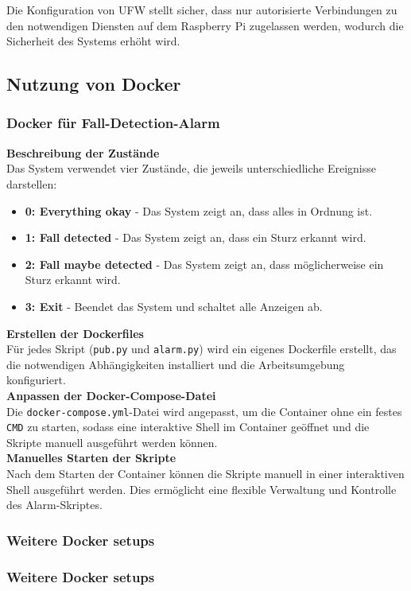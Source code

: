 Die Konfiguration von UFW stellt sicher, dass nur autorisierte Verbindungen zu den notwendigen Diensten auf dem Raspberry Pi zugelassen werden, wodurch die Sicherheit des Systems erhöht wird.


\subsection{Nutzung von Docker}

\subsubsection{Docker für Fall-Detection-Alarm}

\textbf{Beschreibung der Zustände}\\

Das System verwendet vier Zustände, die jeweils unterschiedliche Ereignisse darstellen:

\begin{itemize}
	\item \textbf{0: Everything okay} - Das System zeigt an, dass alles in Ordnung ist.
	\item \textbf{1: Fall detected} - Das System zeigt an, dass ein Sturz erkannt wird.
	\item \textbf{2: Fall maybe detected} - Das System zeigt an, dass möglicherweise ein Sturz erkannt wird.
	\item \textbf{3: Exit} - Beendet das System und schaltet alle Anzeigen ab.
\end{itemize}

\textbf{Erstellen der Dockerfiles}\\

Für jedes Skript (\texttt{pub.py} und \texttt{alarm.py}) wird ein eigenes Dockerfile erstellt, das die notwendigen Abhängigkeiten installiert und die Arbeitsumgebung konfiguriert. \\

\textbf{Anpassen der Docker-Compose-Datei}\\

Die \texttt{docker-compose.yml}-Datei wird angepasst, um die Container ohne ein festes \texttt{CMD} zu starten, sodass eine interaktive Shell im Container geöffnet und die Skripte manuell ausgeführt werden können. \\

\textbf{Manuelles Starten der Skripte}\\

Nach dem Starten der Container können die Skripte manuell in einer interaktiven Shell ausgeführt werden. Dies ermöglicht eine flexible Verwaltung und Kontrolle des Alarm-Skriptes.

\subsubsection{Weitere Docker setups}

\subsubsection{Weitere Docker setups }
